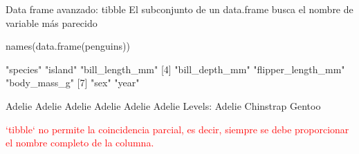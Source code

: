 \documentclass[
  ignorenonframetext,
  aspectratio=169]{beamer}
\newenvironment{Shaded}{\begin{snugshade}}{\end{snugshade}}
\newcommand{\FunctionTok}[1]{\textcolor[rgb]{0.00,0.00,0.00}{#1}}
\newcommand{\NormalTok}[1]{#1}
\newcommand{\SpecialCharTok}[1]{\textcolor[rgb]{0.00,0.00,0.00}{#1}}
\let\oldverbatim\verbatim
\let\endoldverbatim\endverbatim
\renewenvironment{verbatim}{\tiny\oldverbatim}{\endoldverbatim}
\newcommand\red[1]{\textcolor{red}{#1}}
\begin{document}
\begin{frame}[fragile]{Data frame avanzado: tibble}
\protect\hypertarget{data-frame-avanzado-tibble-9}{}
El subconjunto de un data.frame busca el nombre de variable más parecido

\begin{Shaded}
\begin{Highlighting}[]
\FunctionTok{names}\NormalTok{(}\FunctionTok{data.frame}\NormalTok{(penguins))}
\end{Highlighting}
\end{Shaded}

\begin{verbatim}
[1] "species"           "island"            "bill_length_mm"   
[4] "bill_depth_mm"     "flipper_length_mm" "body_mass_g"      
[7] "sex"               "year"             
\end{verbatim}

\begin{Shaded}
\end{Shaded}

\begin{verbatim}
[1] Adelie Adelie Adelie Adelie Adelie Adelie
Levels: Adelie Chinstrap Gentoo
\end{verbatim}

\red{`tibble` no permite la coincidencia parcial, es decir, siempre se debe proporcionar el nombre completo de la columna.}
\end{frame}
\end{document}
